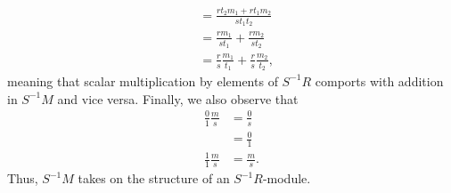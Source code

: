 \documentclass[10pt]{mypackage}
\begin{document}
\begin{solution}
\begin{enumerate}[(a)]
\begin{align*}
                                                                    &= \frac{rt_2m_1 + rt_1m_2}{st_1t_2}\\
                                                                    &= \frac{rm_1}{st_1} + \frac{rm_2}{st_2}\\
                                                                    &= \frac{r}{s}\frac{m_1}{t_1} + \frac{r}{s}\frac{m_2}{t_2},
      \end{align*}
      meaning that scalar multiplication by elements of $S^{-1}R$ comports with addition in $S^{-1}M$ and vice versa. Finally, we also observe that
      \begin{align*}
        \frac{0}{1} \frac{m}{s} &= \frac{0}{s}\\
                                &= \frac{0}{1}\\
        \frac{1}{1} \frac{m}{s} &= \frac{m}{s}.
      \end{align*}
      Thus, $S^{-1}M$ takes on the structure of an $S^{-1}R$-module.
  \end{enumerate}
\end{solution}
\end{document}

